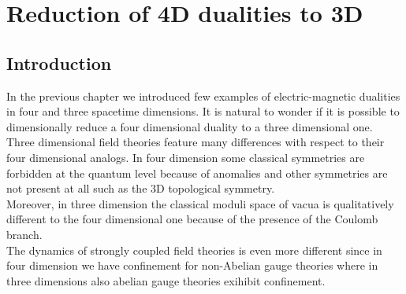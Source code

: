 
\chapter{Reduction of 4D dualities to 3D}

% 


\section{Introduction}
In the previous chapter we introduced few examples of electric-magnetic dualities in four and three spacetime dimensions.
It is natural to wonder if it is possible to dimensionally reduce a four dimensional duality to a three dimensional one.\\
Three dimensional field theories feature many differences with respect to their four dimensional analogs.
In four dimension some classical symmetries are forbidden at the quantum level because of anomalies and other symmetries are not present at all such as the 3D topological symmetry.\\
Moreover, in three dimension the classical moduli space of vacua is qualitatively different to the four dimensional one because of the presence of the Coulomb branch.\\
The dynamics of strongly coupled field theories is even more different since in four dimension we have confinement for non-Abelian gauge theories where in three dimensions also abelian gauge theories exihibit confinement.\\
